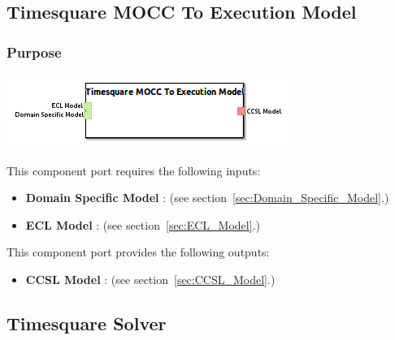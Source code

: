 \documentclass{gemoc} %
\begin{document}
\subsection{Timesquare MOCC To Execution Model}
\label{sec:Timesquare_MOCC_To_Execution_Model}


\subsubsection{Purpose}


\begin{center}
\includegraphics*[trim=0.0cm 0.0cm 0cm 0.0cm, clip=true]{../images/generated/Generated_Timesquare_MOCC_To_Execution_Model.png}
\end{center}

This component port requires the following inputs:
\begin{itemize}
  \item \textbf{Domain Specific Model} :
(see section~\ref{sec:Domain_Specific_Model}.)
  \item \textbf{ECL Model} :
(see section~\ref{sec:ECL_Model}.)
\end{itemize}

This component port provides the following outputs:
\begin{itemize}
  \item \textbf{CCSL Model} :
(see section~\ref{sec:CCSL_Model}.)
\end{itemize}


\subsection{Timesquare Solver}
\label{sec:Timesquare_Solver}
\end{document}
